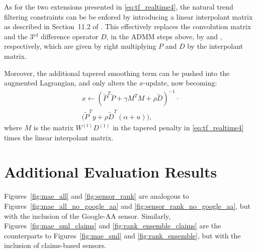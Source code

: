 \documentclass[sts]{imsart}
\def\hP{\hat{P}}
\def\tP{\tilde{P}}
\def\tD{\tilde{D}}
\def\rd{^\mathrm{rd}}
\theoremstyle{plain}
\theoremstyle{definition}
\theoremstyle{remark}
\begin{document}
\begin{appendix}
As for the two extensions presented in \eqref{eq:tf_realtime4}, the natural  
trend filtering constraints can be be enfored by introducing a linear
interpolant matrix as described in Section~11.2 of \citet{tibshirani2020divided}.
This effectively replaces the convolution matrix \smash{$\hP$} and the 3$\rd$
difference operator $D$, in the ADMM steps above, by \smash{$\tP$} and
\smash{$\tD$}, respectively, which are given by right multiplying $P$ and $D$ by
the interpolant matrix.  

Moreover, the additional tapered smoothing term can be pushed into the augmented
Lagrangian, and only alters the $x$-update, now becoming:       
\begin{multline*}
x \leftarrow (\tP^T \tP + \gamma M^T M + \rho \tD)^{-1} \cdot{} \\
 \big(\tP^T y + \rho \tD^T(\alpha + u)\big),
\end{multline*}
where $M$ is the matrix $W^{(t)} D^{(1)}$ in the tapered penalty in
\eqref{eq:tf_realtime4} times the linear interpolant matrix.

\section{Additional Evaluation Results}
\label{app:eval_plots}

Figures~\ref{fig:mae_all} and \ref{fig:sensor_rank} are analogous to
Figures~\ref{fig:mae_all_no_google_aa} and \ref{fig:sensor_rank_no_google_aa},
but with the inclusion of the Google-AA sensor. Similarly,
Figures~\ref{fig:mae_sml_claims} and \ref{fig:rank_ensemble_claims} are the
counterparts to Figures~\ref{fig:mae_sml} and \ref{fig:rank_ensemble}, but with
the inclusion of claims-based sensors.


\end{appendix}
\end{document}
